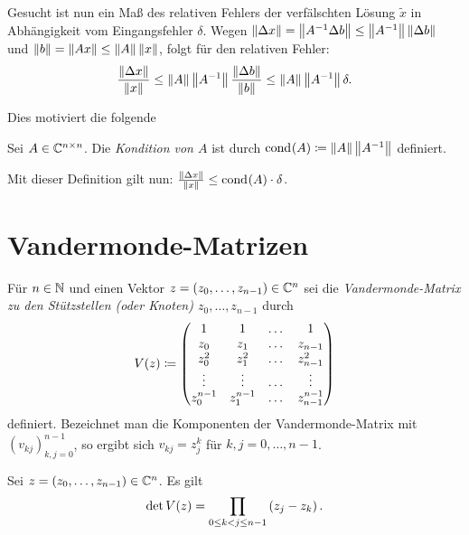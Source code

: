 \noindent Gesucht ist nun ein Maß des relativen Fehlers der verfälschten Lösung
$\tilde{x}$ in Abhängigkeit vom Eingangsfehler $\delta$.
Wegen $ \left\lVert \Delta x \right\rVert = \left\lVert A^{-1} \Delta b \right\rVert \leq \left\lVert A^{-1} \right\rVert \left\lVert \Delta b \right\rVert $
und $ \left\lVert b \right\rVert = \left\lVert A x \right\rVert \leq \left\lVert A \right\rVert \left\lVert x \right\rVert $,
folgt für den relativen Fehler:
\[
    \frac{\left\lVert \Delta x \right\rVert}{\left\lVert x \right\rVert}
    \leq \left\lVert A \right\rVert \left\lVert A^{-1} \right\rVert \frac{\left\lVert \Delta b \right\rVert}{\left\lVert b \right\rVert}
    \leq \left\lVert A \right\rVert \left\lVert A^{-1} \right\rVert \delta.
\]

\noindent Dies motiviert die folgende
\begin{mydef}
    Sei $A \in \mathbb{C}^{n \times n}$.
    Die \emph{Kondition von $A$} ist durch
    $\text{cond}_{{}}\! \left( A \right) \coloneqq \left\lVert A \right\rVert \left\lVert A^{-1} \right\rVert$
    definiert.
\end{mydef}

\begin{remark}
    Mit dieser Definition gilt nun: $ \frac{\left\lVert \Delta x \right\rVert}{\left\lVert x \right\rVert} \leq \text{cond}_{{}}\! \left( A \right) \cdot \delta $.
\end{remark}

\section{Vandermonde-Matrizen}

\begin{mydef}
    Für $n \in \mathbb{N}$ und einen Vektor ${z = (z_0, \dots, z_{n-1}) \in \mathbb{C}^n}$
    sei die
    \emph{Vandermonde-Matrix zu den Stützstellen (oder Knoten) $z_0, \dots, z_{n-1}$}
    durch
    \[
        V \! \left( z \right) \coloneqq \begin{pmatrix}
            1         & 1         & \dots & 1 \\
            z_0       & z_1       & \dots & z_{n-1} \\
            z_0^2     & z_1^2     & \dots & z_{n-1}^2 \\
            \vdots    & \vdots    & \dots & \vdots \\
            z_0^{n-1} & z_1^{n-1} & \dots & z_{n-1}^{n-1}
        \end{pmatrix}
    \]
    definiert.
    Bezeichnet man die Komponenten der Vandermonde-Matrix mit
    $\left( v_{kj} \right)_{k,j = 0}^{n-1}$, so ergibt sich
    $ v_{kj} = z_j^k $ für $k, j = 0, \dots, n-1$.

\end{mydef}

\begin{lemma}
    Sei $z = (z_0, \dots, z_{n-1}) \in \mathbb{C}^n$.
    Es gilt
    \[
        \det V \! \left( z \right)
        = \prod_{0 \leq k < j \leq n-1} \left( z_j - z_k \right).
    \]
\end{lemma}


